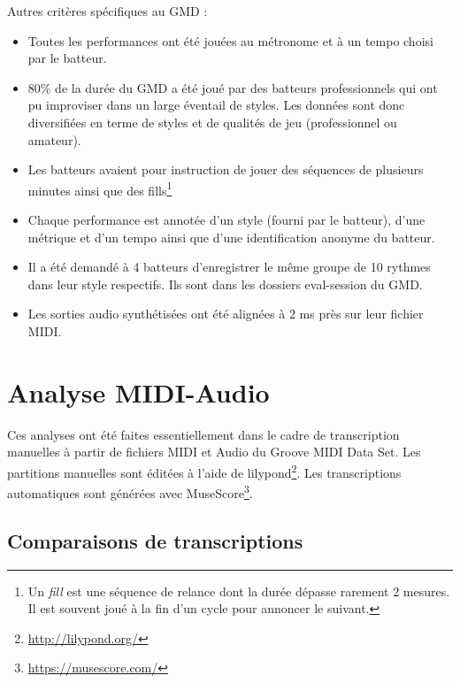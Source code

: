 Autres critères spécifiques au GMD :
\begin{itemize}
	\item Toutes les performances ont été jouées au métronome et à un tempo choisi par le batteur.
	\item 80\% de la durée du GMD a été joué par des batteurs professionnels qui ont pu improviser dans un large éventail de styles. Les données sont donc diversifiées en terme de styles et de qualités de jeu (professionnel ou amateur).
	\item Les batteurs avaient pour instruction de jouer des séquences de plusieurs minutes ainsi que des fills\footnote{Un \textit{fill} est une séquence de relance dont la durée dépasse rarement 2 mesures. Il est souvent joué à la fin d’un cycle pour annoncer le suivant.}
	\item Chaque performance est annotée d’un style (fourni par le batteur), d’une métrique et d’un tempo ainsi que d’une identification anonyme du batteur.
	\item Il a été demandé à 4 batteurs d’enregistrer le même groupe de 10 rythmes dans leur style respectifs. Ils sont dans les dossiers eval-session du GMD.
	\item Les sorties audio synthétisées ont été alignées à 2 ms près sur leur fichier MIDI.
\end{itemize}
\section{Analyse MIDI-Audio}
\label{analyse_midi_audio}
Ces analyses ont été faites essentiellement dans le cadre de transcription manuelles à partir de fichiers MIDI et Audio du Groove MIDI Data Set. Les partitions manuelles sont éditées à l’aide de lilypond\footnote{\url{http://lilypond.org/}}. Les transcriptions automatiques sont générées avec MuseScore\footnote{\url{https://musescore.com/}}.
\subsection*{Comparaisons de transcriptions}
